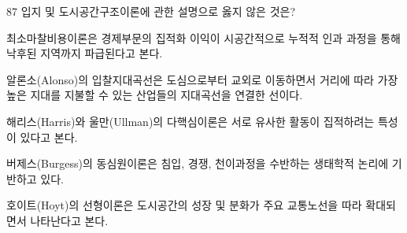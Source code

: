 \begin{question}{87}
입지 및 도시공간구조이론에 관한 설명으로 옳지 않은 것은?
\begin{choices}
  \item 최소마찰비용이론은 경제부문의 집적화 이익이 시공간적으로 누적적 인과 과정을 통해 낙후된 지역까지 파급된다고 본다.
  \item 알론소(Alonso)의 입찰지대곡선은 도심으로부터 교외로 이동하면서 거리에 따라 가장 높은 지대를 지불할 수 있는 산업들의 지대곡선을 연결한 선이다.
  \item 해리스(Harris)와 울만(Ullman)의 다핵심이론은 서로 유사한 활동이 집적하려는 특성이 있다고 본다.
  \item 버제스(Burgess)의 동심원이론은 침입, 경쟁, 천이과정을 수반하는 생태학적 논리에 기반하고 있다.
  \item 호이트(Hoyt)의 선형이론은 도시공간의 성장 및 분화가 주요 교통노선을 따라 확대되면서 나타난다고 본다.
\end{choices}
\end{question}
